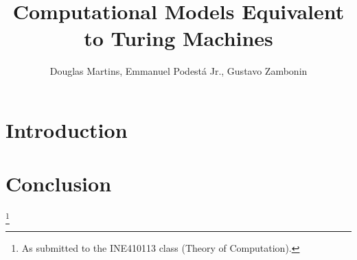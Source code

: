 \documentclass[12pt]{article}
\title{Computational Models Equivalent to Turing Machines}
\author{Douglas Martins\inst{1}, Emmanuel Podestá Jr.\inst{1}, Gustavo Zambonin\inst{1}}
\begin{document}
 

\maketitle

\section{Introduction}\label{sec:intro}



\section{Conclusion}\label{sec:conc}

\footnote{As submitted to the INE410113 class (Theory of Computation).}



\end{document}
